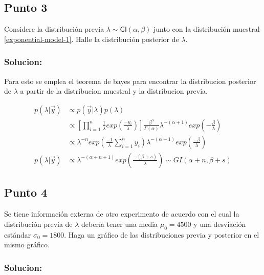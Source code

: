 \documentclass[
]{article}
\begin{document}
\hypertarget{punto-3}{%
\subsection*{Punto 3}\label{punto-3}}

Considere la distribución previa
\(\lambda \sim \textsf{GI} ( \alpha, \beta )\) junto con la distribución
muestral \eqref{exponential-model-1}. Halle la distribución posterior de
\(\lambda\).

\hypertarget{solucion-2}{%
\subsubsection*{Solucion:}\label{solucion-2}}

Para esto se emplea el teorema de bayes para encontrar la distribucion
posterior de \(\lambda\) a partir de la distribucion muestral y la
distribucion previa.

\[
\begin{split}
p(\lambda | \vec{y}) &\propto p(\vec{y}|\lambda)p(\lambda)\\
&\propto \left[ \prod_{i=1}^n \frac{1}{\lambda}exp \left( \frac{-y_i}{\lambda} \right) \right] \frac{\beta^\alpha}{\Gamma(\alpha)}\lambda^{-(\alpha+1)}exp\left( -\frac{\beta}{\lambda} \right)\\
&\propto \lambda^{-n}exp\left( \frac{-1}{\lambda}\sum_{i=1}^ny_i \right)\lambda^{-(\alpha+1)}exp\left( \frac{-\beta}{\lambda} \right)\\
p(\lambda|\vec{y})&\propto \lambda^{-(\alpha +n +1)}exp\left( \frac{-(\beta + s)}{\lambda} \right) \sim GI(\alpha +n,\beta+s)
\end{split}
\]

\hypertarget{punto-4}{%
\subsection*{Punto 4}\label{punto-4}}

Se tiene información externa de otro experimento de acuerdo con el cual
la distribución previa de \(\lambda\) debería tener una media
\(\mu_0 = 4500\) y una desviación estándar \(\sigma_0 = 1800\). Haga un
gráfico de las distribuciones previa y posterior en el mismo gráfico.

\hypertarget{solucion-3}{%
\subsubsection*{Solucion:}\label{solucion-3}}
\end{document}
